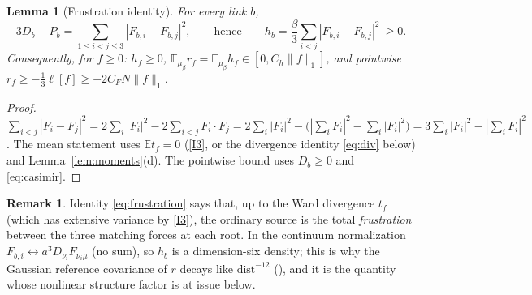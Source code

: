 \documentclass[11pt]{article}
\newtheorem{lemma}[theorem]{Lemma}
\theoremstyle{definition}
\newtheorem{remark}[theorem]{Remark}
\newcommand{\E}{\mathbb{E}}
\begin{document}
\begin{lemma}[Frustration identity]\label{lem:frustration}
For every link $b$,
\begin{equation}\label{eq:frustration}
3D_b-P_b=\sum_{1\le i<j\le3}|F_{b,i}-F_{b,j}|^2,\qquad\text{hence}\qquad
h_b=\frac{\beta}{3}\sum_{i<j}|F_{b,i}-F_{b,j}|^2\ \ge 0 .
\end{equation}
Consequently, for $f\ge0$: $h_f\ge0$, $\E_{\mu_\beta}r_f=\E_{\mu_\beta}h_f\in[0,C_h\|f\|_1]$, and pointwise
$r_f\ge-\tfrac13\ell[f]\ge-2C_FN\|f\|_1$.
\end{lemma}
\begin{proof}
$\sum_{i<j}|F_i-F_j|^2=2\sum_i|F_i|^2-2\sum_{i<j}F_i\cdot F_j=2\sum_i|F_i|^2-\big(|\sum_iF_i|^2-\sum_i|F_i|^2\big)
=3\sum_i|F_i|^2-|\sum_iF_i|^2$. The mean statement uses $\E t_f=0$ (\ref{I3}, or the divergence identity
\eqref{eq:div} below) and Lemma~\ref{lem:moments}(d). The pointwise bound uses $D_b\ge0$ and \eqref{eq:casimir}.
\end{proof}

\begin{remark}
Identity \eqref{eq:frustration} says that, up to the Ward divergence $t_f$ (which has extensive variance by
\ref{I3}), the ordinary source is the total \emph{frustration} between the three matching forces at each root.
In the continuum normalization $F_{b,i}\leftrightarrow a^3D_{\nu_i}F_{\nu_i\mu}$ (no sum), so $h_b$ is a
dimension-six density; this is why the Gaussian reference covariance of $r$ decays like $\mathrm{dist}^{-12}$
(\cite[Part~III, (2.7)]{csj}), and it is the quantity whose nonlinear structure factor is at issue below.
\end{remark}
\end{document}
